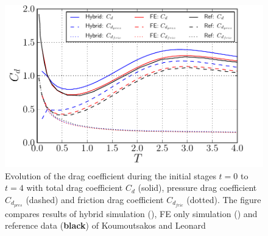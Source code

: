 %     

	\begin{figure}[!p]
	\centering
	\includegraphics[width=0.6\linewidth]{./figures/validation/isc/hybrid_ISC_drag.pdf}
	\caption{ Evolution of the drag coefficient during the initial stages $t=0$ to $t=4$ with total drag coefficient $C_d$ (solid), pressure drag coefficient $C_{d_{pres}}$ (dashed) and friction drag coefficient $C_{d_{fric}}$ (dotted). The figure compares results of hybrid simulation ({}), FE only simulation ({}) and reference data (\textbf{black}) of Koumoutsakos and Leonard \cite{Koumoutsakos1995a}}
	\label{fig:hybrid_ISC_drag}
	\end{figure}

